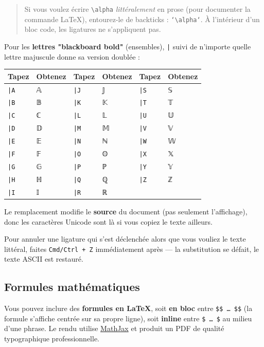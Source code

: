 \documentclass[11pt,a4paper]{article}
\theoremstyle{definition}
\begin{document}
\begin{quote}
Si vous voulez écrire \texttt{\textbackslash{}alpha} \emph{littéralement} en prose (pour
documenter la commande LaTeX), entourez-le de backticks :
\texttt{`\textbackslash{}alpha`}. À l'intérieur d'un bloc code, les ligatures ne
s'appliquent pas.
\end{quote}


Pour les \textbf{lettres "blackboard bold"} (ensembles), \texttt{|} suivi de
n'importe quelle lettre majuscule donne sa version doublée :


\begin{tabularx}{\textwidth}{>{\raggedright\arraybackslash}X>{\raggedright\arraybackslash}X>{\raggedright\arraybackslash}X>{\raggedright\arraybackslash}X>{\raggedright\arraybackslash}X>{\raggedright\arraybackslash}X}
  \toprule
  Tapez & Obtenez & Tapez & Obtenez & Tapez & Obtenez \\
  \midrule
  \texttt{|A} & 𝔸 & \texttt{|J} & 𝕁 & \texttt{|S} & 𝕊 \\
  \texttt{|B} & 𝔹 & \texttt{|K} & 𝕂 & \texttt{|T} & 𝕋 \\
  \texttt{|C} & ℂ & \texttt{|L} & 𝕃 & \texttt{|U} & 𝕌 \\
  \texttt{|D} & 𝔻 & \texttt{|M} & 𝕄 & \texttt{|V} & 𝕍 \\
  \texttt{|E} & 𝔼 & \texttt{|N} & ℕ & \texttt{|W} & 𝕎 \\
  \texttt{|F} & 𝔽 & \texttt{|O} & 𝕆 & \texttt{|X} & 𝕏 \\
  \texttt{|G} & 𝔾 & \texttt{|P} & ℙ & \texttt{|Y} & 𝕐 \\
  \texttt{|H} & ℍ & \texttt{|Q} & ℚ & \texttt{|Z} & ℤ \\
  \texttt{|I} & 𝕀 & \texttt{|R} & ℝ &  &  \\
  \bottomrule
\end{tabularx}

Le remplacement modifie le \textbf{source} du document (pas seulement
l'affichage), donc les caractères Unicode sont là si vous copiez le
texte ailleurs.


Pour annuler une ligature qui s'est déclenchée alors que vous vouliez
le texte littéral, faites \texttt{Cmd/Ctrl + Z} immédiatement après — la
substitution se défait, le texte ASCII est restauré.


\subsection{Formules mathématiques}

Vous pouvez inclure des \textbf{formules en LaTeX}, soit \textbf{en bloc} entre
\texttt{\$\$ … \$\$} (la formule s'affiche centrée sur sa propre ligne), soit
\textbf{inline} entre \texttt{\$ … \$} au milieu d'une phrase. Le rendu utilise
\href{https://www.mathjax.org/}{MathJax} et produit un PDF de qualité
typographique professionnelle.
\end{document}
